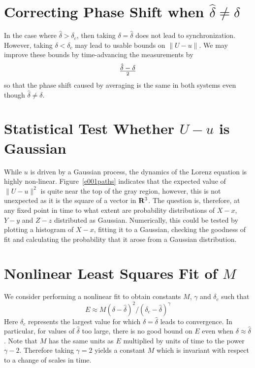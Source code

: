 \documentclass[master,tocprelim,12pt]{unrthesis}
\theoremstyle{definition}
\numberwithin{equation}{chapter}
\begin{document}
\begin{manuscript}
\section{Correcting Phase Shift when $\hat\delta\ne\delta$}

In the case where $\hat\delta > \delta_c$, then taking $\delta =
\hat\delta$ does not lead to synchronization. 
However, taking $\delta < \delta_c$ may lead to usable
bounds on $\|U-u\|$.
We may improve these bounds by time-advancing the measurements by
$$
    \hat\delta - \delta \over 2
$$
so that the phase shift caused by averaging is the same in both 
systems even though $\hat\delta \ne \delta$.

\section{Statistical Test Whether $U-u$ is Gaussian}

While $u$ is driven by a Gaussian process, the dynamics of the Lorenz
equation is highly non-linear.  Figure~\ref{e001paths} indicates 
that the expected
value of $\|U-u\|^2$ is quite near the top of the gray region, however,
this is not unexpected as it is the square of a vector in ${\bf R}^3$.
The question is, therefore, at any fixed point in time to what extent 
are probability distributions of $X-x$, $Y-y$ and $Z-z$ distributed
as Gaussian.  Numerically, this could be tested by plotting a
histogram of $X-x$, fitting it to a Gaussian, checking the goodness
of fit and calculating the probability that it arose from a Gaussian
distribution. 

\section{Nonlinear Least Squares Fit of $M$}
\label{futurehatdelta}
We consider performing a nonlinear fit
%
to obtain constants $M$, $\gamma$ and $\delta_c$ such that
$$
	E \approx  M (\delta-\hat\delta)^2 / (\delta_c-\hat\delta)^\gamma
$$
Here $\delta_c$ represents the largest value for which 
$\delta=\hat\delta$ leads to convergence.  In particular, 
for values of $\hat\delta$ too large, there is no good bound 
on $E$ even when $\delta\approx\hat\delta$.
Note that $M$ has the same units as $E$ multiplied by
units of time to the power $\gamma-2$.  Therefore taking $\gamma=2$ 
yields a constant $M$ which is invariant with respect to a change of 
scales in time.


\end{manuscript}
\end{document}
